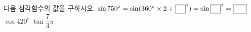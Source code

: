 다음 삼각함수의 값을 구하시오.
 $\sin 750^\circ=\sin(360^\circ\times 2+\blank^{\circ})=\sin\blank^{\circ}=\blank[2em]$
 $\cos 420^\circ$
 $\tan\dfrac{7}{3}\pi$
